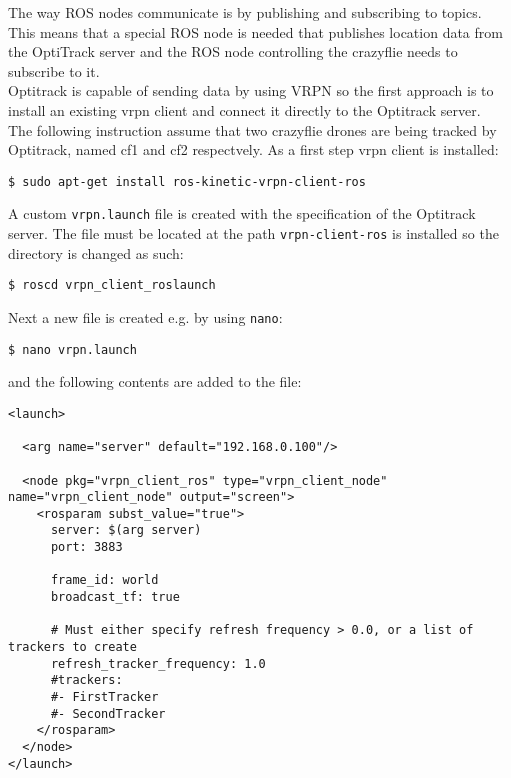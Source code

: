 The way ROS nodes communicate is by publishing and subscribing to topics. This means that a special ROS node is needed that publishes location data from the OptiTrack server and the ROS node controlling the crazyflie needs to subscribe to it.\\
Optitrack is capable of sending data by using VRPN\cite{web_vrpn_wiki} so the first approach is to install an existing vrpn client and connect it directly to the Optitrack server.\\

\noindent The following instruction assume that two crazyflie drones are being tracked by Optitrack, named cf1 and cf2 respectvely. As a first step vrpn client is installed:

\begin{mdframed}[backgroundcolor=light-gray, linecolor=light-gray]
\texttt{\$ sudo apt-get install ros-kinetic-vrpn-client-ros}
\end{mdframed}

\noindent A custom \texttt{vrpn.launch} file is created with the specification of the Optitrack server. The file must be located at the path \texttt{vrpn-client-ros} is installed so the directory is changed as such:
\begin{mdframed}[backgroundcolor=light-gray, linecolor=light-gray]
\texttt{\$ roscd vrpn\_client\_ros\/launch\/}
\end{mdframed}

\noindent Next a new file is created e.g. by using \texttt{nano}:
\begin{mdframed}[backgroundcolor=light-gray, linecolor=light-gray]
\texttt{\$ nano vrpn.launch}
\end{mdframed}

\noindent and the following contents are added to the file:

\begin{verbatim}
<launch>

  <arg name="server" default="192.168.0.100"/>

  <node pkg="vrpn_client_ros" type="vrpn_client_node" name="vrpn_client_node" output="screen">
    <rosparam subst_value="true">
      server: $(arg server)
      port: 3883

      frame_id: world
      broadcast_tf: true

      # Must either specify refresh frequency > 0.0, or a list of trackers to create
      refresh_tracker_frequency: 1.0
      #trackers:
      #- FirstTracker
      #- SecondTracker
    </rosparam>
  </node>
</launch>
\end{verbatim}

